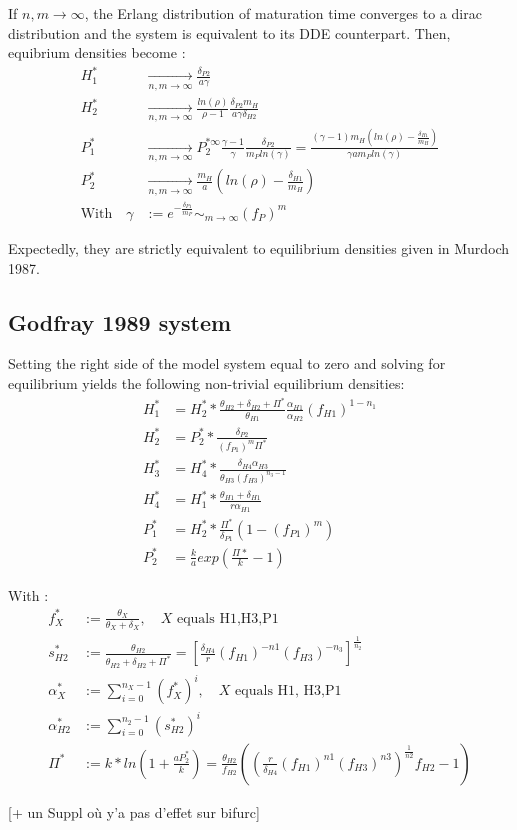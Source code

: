 \documentclass[12pt,a4paper,onecolumn]{article}
\begin{document}
If $n,m\to\infty$, the Erlang distribution of maturation time converges to a dirac distribution and the system is equivalent to its DDE counterpart. Then, equibrium densities become : 
\begin{align}
H_1^* & \xrightarrow[n,m\to\infty]{} \frac{\delta_{P2}}{a\gamma} \nonumber \\
H_2^* & \xrightarrow[n,m\to\infty]{} \frac{ln(\rho)}{\rho-1} \frac{\delta_{P2} m_H}{a \gamma \delta_{H2}} \nonumber \\
P_1^* & \xrightarrow[n,m\to\infty]{} P_2^{* \infty} \frac{\gamma -1}{\gamma} \frac{\delta_{P2}}{m_P ln(\gamma)} = \frac{(\gamma-1)m_H(ln(\rho) - \frac{\delta_{H1}}{m_H})}{\gamma  a  m_P   ln(\gamma)} \\
P_2^*&  \xrightarrow[n,m\to\infty]{} \frac{m_H}{a}(ln(\rho) - \frac{\delta_{H1}}{m_H}) \nonumber  \\
\text{With} \quad \gamma & := e^{-\frac{\delta_{P1}}{m_P}} \sim_{m \to \infty} (f_P)^m \nonumber
\end{align}


Expectedly, they are strictly equivalent to equilibrium densities given in Murdoch 1987.

\subsection{Godfray 1989 system}

Setting the right side of the model system equal to zero and solving for equilibrium yields the following non-trivial equilibrium densities:
 \begin{align}
  H_1^* &= H_2^* * \frac{\theta_{H2}+\delta_{H2}+\Pi^*}{\theta_{H1}} \frac{\alpha_{H1}}{\alpha_{H2}} (f_{H1})^{1-n_1} \nonumber \\
  H_2^* &= P_2^* * \frac{\delta_{P2}}{(f_{P1})^{m} \Pi^*} \nonumber \\
  H_3^* &= H_4^* * \frac{\delta_{H4} \alpha_{H3}}{\theta_{H3}(f_{H3})^{n_3-1}}  \nonumber \\
  H_4^* &= H_1^* * \frac{\theta_{H1}+\delta_{H1}}{r \alpha_{H1}}  \\
  P_1^* &= H_2^* * \frac{\Pi^*}{\delta_{P1}}(1-(f_{P1})^{m}) \nonumber \\
  P_2^* &= \frac{k}{a}exp(\frac{\Pi*}{k}-1) \nonumber 
\end{align}

With :
 \begin{align}
  f_X^* &:= \frac{\theta_X}{\theta_X + \delta_X}, \quad \text{$X$ equals H1,H3,P1} \nonumber \\
  s_{H2}^* &:= \frac{\theta_{H2}}{\theta_{H2} + \delta_{H2} + \Pi^*} = [\frac{\delta_{H4}}{r}(f_{H1})^{-n1}(f_{H3})^{-n_3}]^{\frac{1}{n_2}}\nonumber \\
  \alpha_X^* &:= \sum_{i=0}^{n_X-1} (f_X^*)^i,  \quad \text{$X$ equals H1, H3,P1} \\
  \alpha_{H2}^* &:= \sum_{i=0}^{n_2-1} (s_{H2}^*)^i \nonumber \\
  \Pi^* &:= k*ln(1+\frac{aP_2^*}{k}) = \frac{\theta_{H2}}{f_{H2}} ((\frac{r}{\delta_{H4}}(f_{H1})^{n1}(f_{H3})^{n3})^{\frac{1}{n2}}f_{H2} -1)\nonumber 
 \end{align}

[+ un Suppl où y'a pas d'effet sur bifurc]
\end{document}
